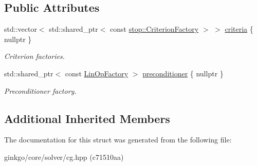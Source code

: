 \subsection*{Public Attributes}
\begin{DoxyCompactItemize}
\item 
\mbox{\label{structgko_1_1solver_1_1Cg_1_1parameters__type_af8544e18d6657180b3a13a98c79e4fa8}} 
std\+::vector$<$ std\+::shared\+\_\+ptr$<$ const \hyperlink{group__stop_gab12a51109c50b35ec36dc5a393d6a9a0}{stop\+::\+Criterion\+Factory} $>$ $>$ \hyperlink{structgko_1_1solver_1_1Cg_1_1parameters__type_af8544e18d6657180b3a13a98c79e4fa8}{criteria} \{ nullptr \}
\begin{DoxyCompactList}\small\item\em Criterion factories. \end{DoxyCompactList}\item 
\mbox{\label{structgko_1_1solver_1_1Cg_1_1parameters__type_ab319c47fc1c31ad73d58c6aac4fdea6f}} 
std\+::shared\+\_\+ptr$<$ const \hyperlink{classgko_1_1LinOpFactory}{Lin\+Op\+Factory} $>$ \hyperlink{structgko_1_1solver_1_1Cg_1_1parameters__type_ab319c47fc1c31ad73d58c6aac4fdea6f}{preconditioner} \{ nullptr \}
\begin{DoxyCompactList}\small\item\em Preconditioner factory. \end{DoxyCompactList}\end{DoxyCompactItemize}
\subsection*{Additional Inherited Members}


The documentation for this struct was generated from the following file\+:\begin{DoxyCompactItemize}
\item 
ginkgo/core/solver/cg.\+hpp (c71510aa)\end{DoxyCompactItemize}
